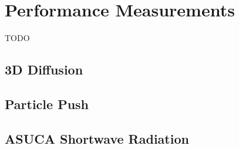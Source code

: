 \chapter{Performance Measurements}
TODO

\section{3D Diffusion}

\section{Particle Push}

\section{ASUCA Shortwave Radiation}
